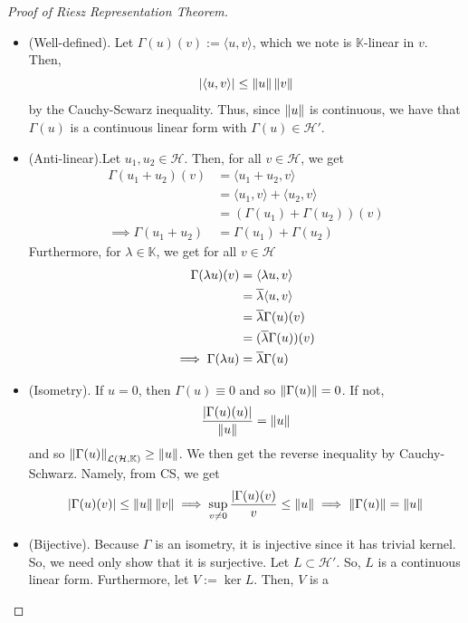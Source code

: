 \documentclass[11pt,leqno,oneside]{amsbook}
\numberwithin{thm}{section}
\newcommand{\cL}{\mathcal{L}}
\newcommand{\K}{\mathbb{K}} %
\renewcommand{\H}{\mathcal{H}} %
\begin{document}
\begin{proof}[Proof of Riesz Representation Theorem]
  \begin{itemize}
  \item (Well-defined). Let \(\Gamma(u)(v) := \langle u,v \rangle\),
    which we note is \(\K\)-linear in \(v\). Then, \[
      \left| \langle u,v \rangle \right| \leq \norm[u] \norm[v]
    \]
    by the Cauchy-Scwarz inequality. Thus, since \(\norm[u]\) is
    continuous, we have that \(\Gamma(u)\) is a continuous linear form
    with \(\Gamma(u) \in \H'\).
  \item (Anti-linear).Let \(u_1,u_2 \in \H\). Then, for all \(v \in
    \H\), we get
    \begin{align*}
      \Gamma(u_1+u_2)(v) & = \langle u_1 + u_2, v \rangle \\
                         & = \langle u_1,v \rangle + \langle u_2, v \rangle \\
                         & = (\Gamma(u_1) + \Gamma(u_2))(v) \\
      \implies \Gamma(u_1+u_2) & = \Gamma(u_1) + \Gamma(u_2)
    \end{align*}
    Furthermore, for \(\lambda \in \K\), we get for all \(v \in \H\)
    \begin{align*}
      \Gamma(\lambda u)(v) & = \langle \lambda u, v \rangle \\
                           & = \ov{\lambda} \langle u,v \rangle \\
                           & = \ov{\lambda} \Gamma(u)(v) \\
                           & = (\ov{\lambda} \Gamma(u))(v) \\
      \implies \Gamma(\lambda u) & = \ov{\lambda} \Gamma(u)
    \end{align*}
  \item (Isometry). If \(u = 0\), then \(\Gamma(u) \equiv 0\) and so
    \(\norm[\Gamma(u)] = 0\). If not, \[
      \frac{|\Gamma(u)(u)|}{\norm[u]} = \norm[u]
    \]
    and so \(\norm[\Gamma(u)]_{\cL(\H,\K)} \geq \norm[u]\). We then
    get the reverse inequality by Cauchy-Schwarz. Namely, from CS, we
    get \[
      |\Gamma(u)(v)| \leq \norm[u]\norm[v] \implies \sup_{v \neq 0}
      \frac{|\Gamma(u)(v)}{v} \leq \norm[u] \implies \norm[\Gamma(u)]
      = \norm[u]
    \]
  \item (Bijective). Because \(\Gamma\) is an isometry, it is
    injective since it has trivial kernel. So, we need only show that
    it is surjective. Let \(L \subset \H'\). So, \(L\) is a continuous
    linear form. Furthermore, let \(V := \ker L\). Then, \(V\) is a

\end{itemize}
\end{proof}
\end{document}
